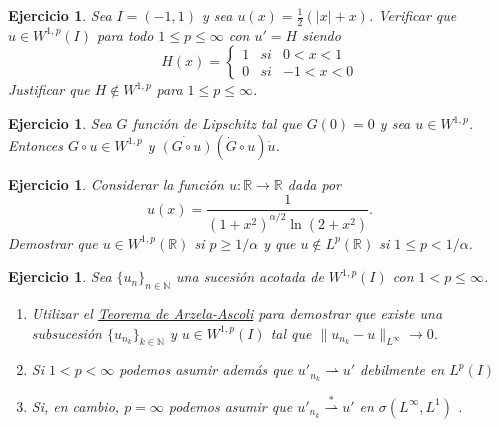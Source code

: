 \documentclass{article}
\newcounter{ejer}
\newtheorem{ejercicio}[ejer]{Ejercicio}}
\newcommand{\rr}{\mathbb{R}}
\newcommand{\nn}{\mathbb{N}}
\begin{document}
\begin{ejercicio}
Sea $I=(-1,1)$ y sea $u(x)=\frac{1}{2}(|x|+x)$.
Verificar que $u\in  W^{1,p}(I)$ para todo $1\leq p\leq \infty$ con $u'=H$ siendo \[H(x)=\left\{\begin{array}{ccc}
1&si&0<x<1
\\
0&si&-1<x<0
\end{array}
\right.\]
Justificar que  $H\notin W^{1,p} $ para $1\leq p \leq \infty$.
\end{ejercicio}




\begin{ejercicio}
Sea $G$ funci\'on de Lipschitz  tal que $G(0)=0$ y sea $u \in W^{1,p}$. Entonces
$G\circ u \in W^{1,p}$ y $\dot{(G\circ u)}(\dot{G}\circ u)\dot {u}$.
\end{ejercicio}

\begin{ejercicio} Considerar la función $u:\mathbb{R}\to\mathbb{R}$ dada por
\[u(x)=\frac{1}{(1+x^2)^{\alpha/2} \ln(2+x^2) }.\]
Demostrar que $u\in W^{1,p}(\rr)$ si $p\geq 1/\alpha$ y que $u\notin  L^{p}(\rr)$ si $1\leq p <1/\alpha$.

\end{ejercicio}


\begin{ejercicio} Sea $\{u_n\}_{n\in\nn}$ una sucesión acotada de $W^{1,p}(I)$ con $1<p\leq \infty$.
 \begin{enumerate}
  \item Utilizar el \href{https://es.wikipedia.org/wiki/Teorema_de_Arzel\%C3\%A1-Ascoli}{Teorema de Arzela-Ascoli} para demostrar que existe una subsucesión $\{u_{n_k}\}_{k\in\nn}$ y $u\in W^{1,p}(I)$ tal que $\|  u_{n_k}-u\|_{L^{\infty}}\to 0$.
  \item Si $1<p<\infty$ podemos asumir además que $ u'_{n_k} \rightharpoonup u'$ debilmente en $L^p(I)$
  \item Si, en cambio,  $p=\infty$  podemos asumir que $ u'_{n_k} \overset{*}{\rightharpoonup} u'$ en $\sigma(L^{\infty},L^1)$ .
 \end{enumerate}
\end{ejercicio}
\end{document}
